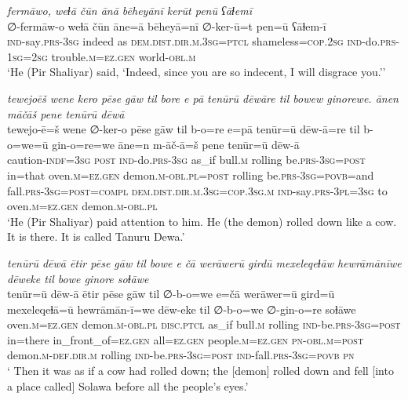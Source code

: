 \ea \label{ŽP.198}
\textit{fermāwo, weɫā čūn ānā bēheyānī kerūt penū ʕāɫemī} \\ 
\gll ∅-fermāw-o weɫā čūn āne=ā bēheyā=nī ∅-ker-ū=t pen=ū ʕāɫem-ī \\ 
 \textsc{ind-}say\textsc{.prs}\textsc{-3sg} indeed as \textsc{dem.dist}\textsc{.dir}\textsc{.m}\textsc{.3sg}=\textsc{ptcl} shameless\textsc{=cop}\textsc{.\textsc{2sg}} \textsc{ind-}do\textsc{.prs}\textsc{-\textsc{1sg}}\textsc{=\textsc{2sg}} trouble\textsc{.m}\textsc{\textsc{=ez.gen}} world\textsc{-obl}\textsc{.m} \\ 
\glt `He (Pir Shaliyar) said, ‘Indeed, since you are so indecent, I will disgrace you.’'
\z 
 
\ea \label{ŽP.200}
\textit{tewejoēš wene kero pēse gāw til bore e pā tenūrū dēwāre til bowew ginorewe. ānen māčāš pene tenūrū dēwā} \\ 
\gll tewejo-ē=š wene ∅-ker-o pēse gāw til b-o=re e=pā tenūr=ū dēw-ā=re til b-o=we=ū gin-o=re=we āne=n m-āč-ā=š pene tenūr=ū dēw-ā \\ 
 caution\textsc{-indf}\textsc{=3sg} \textsc{post} \textsc{ind-}do\textsc{.prs}\textsc{-3sg} as\_if bull\textsc{.m} rolling be\textsc{.prs}\textsc{-3sg}\textsc{=\textsc{post}} in=that oven\textsc{.m}\textsc{\textsc{=ez.gen}} demon\textsc{.m}\textsc{-obl}\textsc{.pl}\textsc{=\textsc{post}} rolling be\textsc{.prs}\textsc{-3sg}\textsc{=\textsc{povb}}=and fall\textsc{.prs}\textsc{-3sg}\textsc{=\textsc{post}}\textsc{=compl} \textsc{dem.dist}\textsc{.dir}\textsc{.m}\textsc{.3sg}\textsc{=cop}\textsc{.3sg}\textsc{.m} \textsc{ind-}say\textsc{.prs}\textsc{-3pl}\textsc{=3sg} to oven\textsc{.m}\textsc{\textsc{=ez.gen}} demon\textsc{.m}\textsc{-obl}\textsc{.pl} \\ 
\glt `He (Pir Shaliyar) paid attention to him. He (the demon) rolled down like a cow. It is there. It is called Tanuru Dewa.'
\z 
 
\ea \label{ŽP.201}
\textit{tenūrū dēwā ētir pēse gāw til bowe e čā werāwerū girdū mexeleqeɫāw hewrāmānīwe dēweke til bowe ginore soɫāwe} \\ 
\gll tenūr=ū dēw-ā ētir pēse gāw til ∅-b-o=we e=čā werāwer=ū gird=ū mexeleqeɫā=ū hewrāmān-ī=we dēw-eke til ∅-b-o=we ∅-gin-o=re soɫāwe \\ 
 oven\textsc{.m}\textsc{\textsc{=ez.gen}} demon\textsc{.m}\textsc{-obl}\textsc{.pl} \textsc{disc.ptcl} as\_if bull\textsc{.m} rolling \textsc{ind-}be\textsc{.prs}\textsc{-3sg}\textsc{=\textsc{post}} in=there in\_front\_of\textsc{\textsc{=ez.gen}} all\textsc{\textsc{=ez.gen}} people\textsc{.m}\textsc{\textsc{=ez.gen}} \textsc{pn}\textsc{-obl}\textsc{.m}\textsc{=\textsc{post}} demon\textsc{.m}\textsc{-def}\textsc{.dir}\textsc{.m} rolling \textsc{ind-}be\textsc{.prs}\textsc{-3sg}\textsc{=\textsc{post}} \textsc{ind-}fall\textsc{.prs}\textsc{-3sg}\textsc{=\textsc{povb}} \textsc{pn} \\ 
\glt ` Then it was as if a cow had rolled down; the [demon] rolled down and fell [into a place called] Solawa before all the people’s eyes.'
\z 
 
